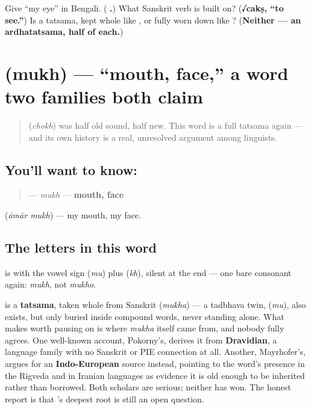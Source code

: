 \begin{tcolorbox}[breakable,colback=teal!4,colframe=teal!35!black,title={Before you move on}]
Give \textquotedblleft{}my eye\textquotedblright{} in Bengali. (\textbf{ .}) What Sanskrit verb is  built on? (\textbf{√cakṣ, \textquotedblleft{}to see.\textquotedblright{}}) Is  a tatsama, kept whole like , or fully worn down like ? (\textbf{Neither — an ardhatatsama, half of each.})
\end{tcolorbox}
\section[\texorpdfstring{\bn{মুখ} (mukh)}{মুখ (mukh)}]{ (mukh) — \textquotedblleft{}mouth, face,\textquotedblright{} a word two families both claim}

\label{lesson:BN-C12-mukh}



\begin{quote}
 (\emph{chokh}) was half old sound, half new. This word is a full tatsama again — and its own history is a real, unresolved argument among linguists.
\end{quote}

\subsection*{You'll want to know: }
\begin{quote}
\textbf{} — \emph{mukh} — \textbf{mouth, face}
\end{quote}

\textbf{ } (\emph{āmār mukh}) — my mouth, my face.

\subsection*{The letters in this word}
\textbf{} is \textbf{} with the vowel sign \textbf{} (\emph{mu}) plus \textbf{} (\emph{kh}), silent at the end — one bare consonant again: \emph{mukh}, not \emph{mukho}.

\begin{cousinweb}
\textbf{} is a \textbf{tatsama}, taken whole from Sanskrit \textbf{} (\emph{mukha}) — a tadbhava twin, \textbf{} (\emph{mu}), also exists, but only buried inside compound words, never standing alone. What makes  worth pausing on is where \emph{mukha} itself came from, and nobody fully agrees. One well-known account, Pokorny's, derives it from \textbf{Dravidian}, a language family with no Sanskrit or PIE connection at all. Another, Mayrhofer's, argues for an \textbf{Indo-European} source instead, pointing to the word's presence in the Rigveda and in Iranian languages as evidence it is old enough to be inherited rather than borrowed. Both scholars are serious; neither has won. The honest report is that 's deepest root is still an open question.
\end{cousinweb}


